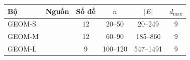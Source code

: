 \begin{tabular}{llcccc}
\toprule
Bộ & Nguồn & Số đề & $n$ & $|E|$ & $d_{\max}$\\
\midrule
GEOM-S & \citet{nguyen2026bcp} & 12 & 20--50 & 20--249 & 9\\
GEOM-M & \citet{nguyen2026bcp} & 12 & 60--90 & 185--860 & 9\\
GEOM-L & \citet{nguyen2026bcp} & 9 & 100--120 & 547--1491 & 9\\
\bottomrule
\end{tabular}
